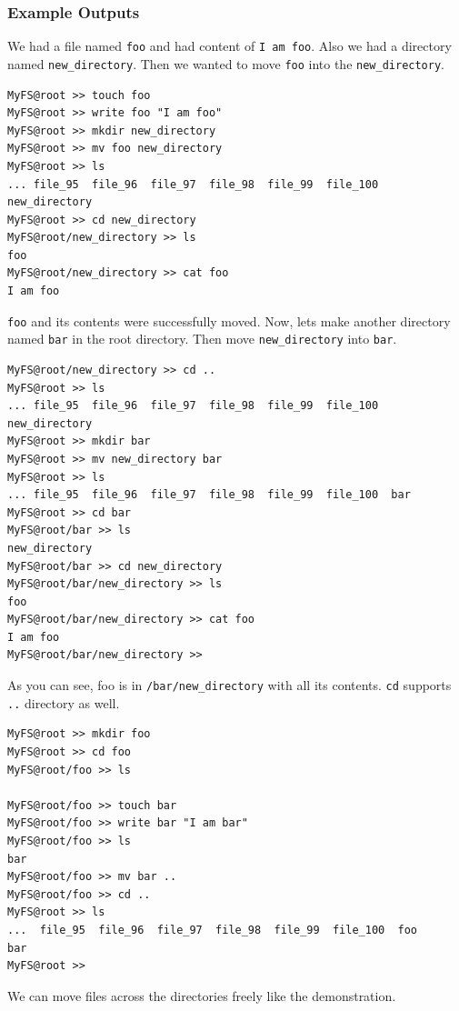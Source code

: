 \documentclass{homework}
\begin{document}
\subsubsection{Example Outputs}
We had a file named \texttt{foo} and had content of \texttt{I am foo}. Also we had a directory named \texttt{new_directory}. Then we wanted to move \texttt{foo} into the \texttt{new_directory}.
\\
\begin{center}
\begin{code}
\begin{verbatim}
MyFS@root >> touch foo
MyFS@root >> write foo "I am foo"
MyFS@root >> mkdir new_directory
MyFS@root >> mv foo new_directory
MyFS@root >> ls
... file_95  file_96  file_97  file_98  file_99  file_100  new_directory
MyFS@root >> cd new_directory
MyFS@root/new_directory >> ls
foo
MyFS@root/new_directory >> cat foo
I am foo
\end{verbatim}
\end{code}
\end{center}
\texttt{foo} and its contents were successfully moved. Now, lets make another directory named \texttt{bar} in the root directory. Then move \texttt{new_directory} into \texttt{bar}.
\\
\begin{center}
\begin{code}
\begin{verbatim}
MyFS@root/new_directory >> cd ..
MyFS@root >> ls
... file_95  file_96  file_97  file_98  file_99  file_100  new_directory
MyFS@root >> mkdir bar
MyFS@root >> mv new_directory bar
MyFS@root >> ls
... file_95  file_96  file_97  file_98  file_99  file_100  bar
MyFS@root >> cd bar
MyFS@root/bar >> ls
new_directory
MyFS@root/bar >> cd new_directory
MyFS@root/bar/new_directory >> ls
foo
MyFS@root/bar/new_directory >> cat foo
I am foo
MyFS@root/bar/new_directory >>
\end{verbatim}
\end{code}
\end{center}
As you can see, foo is in \texttt{/bar/new_directory} with all its contents. \texttt{cd} supports \texttt{..} directory as well.
\\
\begin{center}
\begin{code}
\begin{verbatim}
MyFS@root >> mkdir foo
MyFS@root >> cd foo
MyFS@root/foo >> ls

MyFS@root/foo >> touch bar
MyFS@root/foo >> write bar "I am bar"
MyFS@root/foo >> ls
bar
MyFS@root/foo >> mv bar ..
MyFS@root/foo >> cd ..
MyFS@root >> ls
...  file_95  file_96  file_97  file_98  file_99  file_100  foo
bar
MyFS@root >> 
\end{verbatim}
\end{code}
\end{center}
We can move files across the directories freely like the demonstration.
\end{document}

